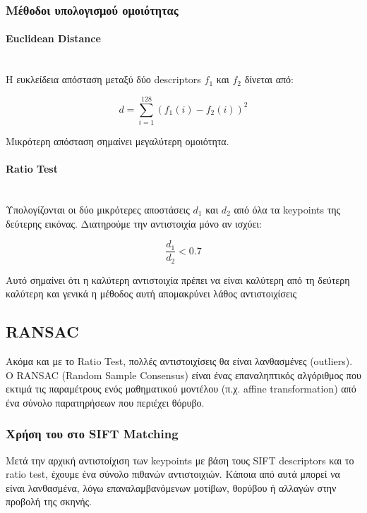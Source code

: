 \documentclass[12pt]{article}
\begin{document}
\subsubsection{Μέθοδοι υπολογισμού ομοιότητας }
\paragraph{Euclidean Distance}
\mbox{}\\
Η ευκλείδεια απόσταση μεταξύ δύο descriptors $f_1$ και $f_2$ δίνεται από:

\[
d = \sum_{i=1}^{128} (f_1(i) - f_2(i))^2
\]

Μικρότερη απόσταση σημαίνει μεγαλύτερη ομοιότητα.


\paragraph{Ratio Test }
\mbox{}\\

Υπολογίζονται οι δύο μικρότερες αποστάσεις $d_1$ και $d_2$ από όλα τα keypoints της δεύτερης εικόνας.
Διατηρούμε την αντιστοιχία μόνο αν ισχύει:

\[
\frac{d_1}{d_2} < 0.7
\]

Αυτό σημαίνει ότι η καλύτερη αντιστοιχία πρέπει να είναι καλύτερη από τη δεύτερη καλύτερη και γενικά η μέθοδος αυτή απομακρύνει λάθος αντιστοιχίσεις

\subsection{RANSAC}
Ακόμα και με το Ratio Test, πολλές αντιστοιχίσεις θα είναι λανθασμένες (outliers). Ο RANSAC (Random Sample Consensus) είναι ένας επαναληπτικός αλγόριθμος
που εκτιμά τις παραμέτρους ενός μαθηματικού μοντέλου (π.χ. affine transformation) από ένα σύνολο παρατηρήσεων που περιέχει θόρυβο.

\subsubsection{Χρήση του στο SIFT Matching}
Μετά την αρχική αντιστοίχιση των keypoints με βάση τους SIFT descriptors και το ratio test, έχουμε ένα σύνολο πιθανών αντιστοιχιών.
Κάποια από αυτά μπορεί να είναι λανθασμένα, λόγω επαναλαμβανόμενων μοτίβων, θορύβου ή αλλαγών στην προβολή της σκηνής.
\end{document}
